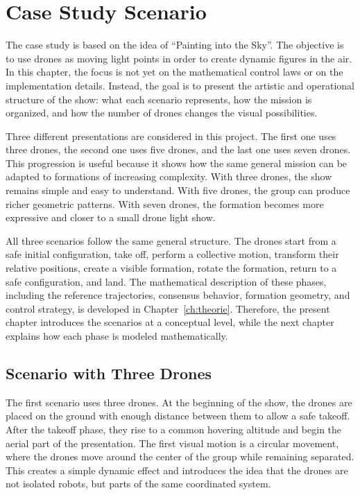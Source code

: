 \section{Case Study Scenario}

The case study is based on the idea of ``Painting into the Sky''. The objective is to use drones as moving light points in order to create dynamic figures in the air. In this chapter, the focus is not yet on the mathematical control laws or on the implementation details. Instead, the goal is to present the artistic and operational structure of the show: what each scenario represents, how the mission is organized, and how the number of drones changes the visual possibilities.

Three different presentations are considered in this project. The first one uses three drones, the second one uses five drones, and the last one uses seven drones. This progression is useful because it shows how the same general mission can be adapted to formations of increasing complexity. With three drones, the show remains simple and easy to understand. With five drones, the group can produce richer geometric patterns. With seven drones, the formation becomes more expressive and closer to a small drone light show.

All three scenarios follow the same general structure. The drones start from a safe initial configuration, take off, perform a collective motion, transform their relative positions, create a visible formation, rotate the formation, return to a safe configuration, and land. The mathematical description of these phases, including the reference trajectories, consensus behavior, formation geometry, and control strategy, is developed in Chapter~\ref{ch:theorie}. Therefore, the present chapter introduces the scenarios at a conceptual level, while the next chapter explains how each phase is modeled mathematically.

\subsection{Scenario with Three Drones}

The first scenario uses three drones. At the beginning of the show, the drones are placed on the ground with enough distance between them to allow a safe takeoff. After the takeoff phase, they rise to a common hovering altitude and begin the aerial part of the presentation. The first visual motion is a circular movement, where the drones move around the center of the group while remaining separated. This creates a simple dynamic effect and introduces the idea that the drones are not isolated robots, but parts of the same coordinated system.

